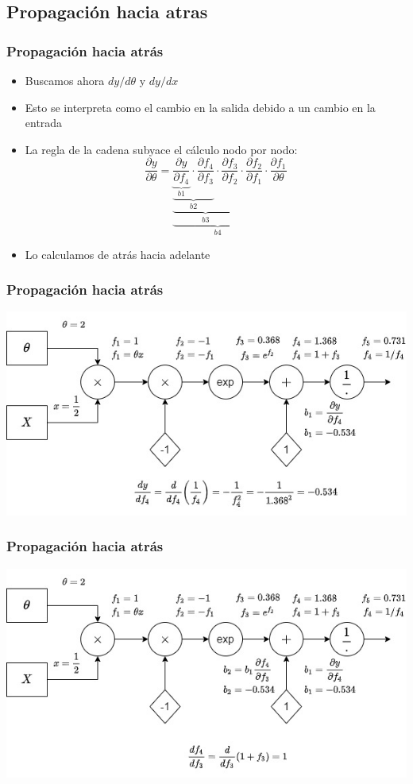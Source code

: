 \documentclass{beamer}
\begin{document}
\subsection{Propagación hacia atras}
\begin{frame}
\frametitle{Propagación hacia atrás}
\begin{itemize}
\item Buscamos ahora $dy/d\theta$ y $dy/dx$
 \item Esto se interpreta como el cambio en la salida debido a un cambio en la entrada
 \item La regla de la cadena subyace el cálculo nodo por nodo:
 \begin{equation*}
 \frac{\partial y}{\partial \theta}= \underbrace{\underbrace{\underbrace{\underbrace{\frac{\partial y}{\partial f_4}}_{b1} \cdot \frac{\partial f_4}{\partial f_3}}_{b2}\cdot \frac{\partial f_3}{\partial f_2}}_{b3} \cdot\frac{\partial f_2}{\partial f_1}}_{b4}\cdot \frac{\partial f_1}{\partial\theta}
 \end{equation*}
 \item Lo calculamos de atrás hacia adelante
\end{itemize}

\end{frame}
\begin{frame}
\frametitle{Propagación hacia atrás}
\includegraphics[scale=0.4]{im3}
\end{frame}
\begin{frame}
\frametitle{Propagación hacia atrás}
\includegraphics[scale=0.4]{im4}
\end{frame}
\end{document}
